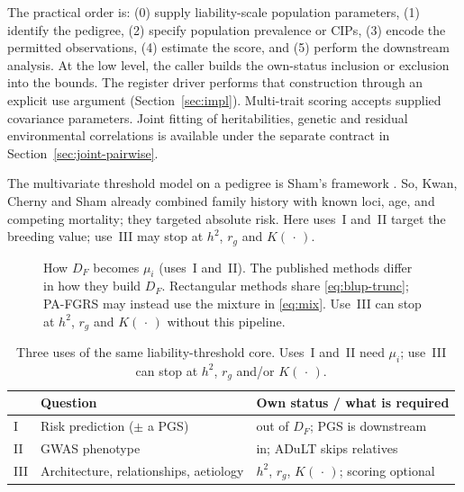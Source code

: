 \documentclass[11pt,a4paper]{article}
\newcommand{\E}{\mathbb{E}}
\newcommand{\h}{h^{2}}
\begin{document}
The practical order is: (0) supply
liability-scale population parameters, (1) identify the pedigree,
(2) specify population prevalence or CIPs, (3) encode the permitted
observations, (4) estimate the score, and (5) perform the downstream
analysis. At the low level, the caller builds the own-status inclusion
or exclusion into the bounds. The register driver performs that
construction through an explicit use argument (Section~\ref{sec:impl}).
Multi-trait scoring accepts supplied covariance parameters. Joint fitting of
heritabilities, genetic and residual environmental correlations is available
under the separate contract in Section~\ref{sec:joint-pairwise}.

The multivariate threshold model on a pedigree is Sham's
framework \cite{sham1998}.
So, Kwan, Cherny and Sham \cite{so2011} already combined family
history with known loci, age, and competing mortality; they targeted
absolute risk.
Here uses~I and~II target the breeding value; use~III may stop at
$\h$, $r_g$ and $K(\,\cdot\,)$.

\begin{figure}[ht]
\centering
{}
\caption{How $D_F$ becomes $\mu_i$ (uses~I and~II).
The published methods differ in how they build $D_F$.
Rectangular methods share \eqref{eq:blup-trunc}; PA-FGRS may instead
use the mixture in \eqref{eq:mix}.
Use~III can stop at $\h$, $r_g$ and $K(\,\cdot\,)$ without this
pipeline.}
\label{fig:pipeline}
\end{figure}

\begin{table}[ht]
\centering
\caption{Three uses of the same liability-threshold core.
Uses~I and~II need $\mu_i$; use~III can stop at $\h$, $r_g$
and/or $K(\,\cdot\,)$.}
\label{tab:uses}
\small
\begin{tabular}{@{}llp{6.6cm}@{}}
\toprule
 & Question & Own status / what is required \\
\midrule
I & Risk prediction ($\pm$ a PGS) &
  out of $D_F$; PGS is downstream \\
II & GWAS phenotype &
  in; ADuLT skips relatives \\
III & Architecture, relationships, aetiology &
  $\h$, $r_g$, $K(\,\cdot\,)$; scoring optional \\
\bottomrule
\end{tabular}
\end{table}
\end{document}
